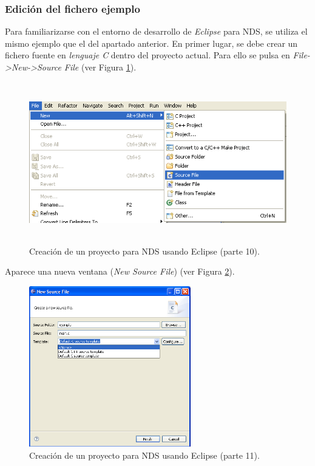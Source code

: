 \subsubsection{Edición del fichero ejemplo}
Para familiarizarse con el entorno de desarrollo de \textit{Eclipse} para NDS, se utiliza el mismo ejemplo que el del apartado anterior. En primer lugar, se debe crear un fichero fuente en \textit{lenguaje C} dentro del proyecto actual. Para ello se pulsa en \textit{File->New->Source File} (ver Figura \ref{fig_c2_eclipse9}).

\begin{figure}[t]
	\centering
	\includegraphics[height=7cm]{./Figuras/C2/c2_eclipse9.png}
	\caption{Creación de un proyecto para NDS usando Eclipse  (parte 10).}
	\label{fig_c2_eclipse9}
\end{figure}

Aparece una nueva ventana (\textit{New Source File}) (ver Figura \ref{fig_c2_eclipse10}).

\begin{figure}[t]
	\centering
	\includegraphics[height=7cm]{./Figuras/C2/c2_eclipse10.png}
	\caption{Creación de un proyecto para NDS usando Eclipse  (parte 11).}
	\label{fig_c2_eclipse10}
\end{figure}


